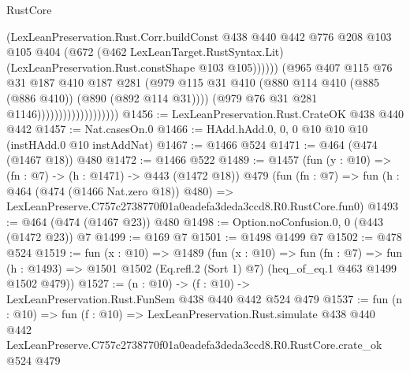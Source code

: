 \begin{lexlean}{RustCore}
\begin{coremodule}
                                            (LexLeanPreservation.Rust.Corr.buildConst
                                              @438
                                              @440
                                              @442
                                              @776
                                              @208
                                              @103
                                              @105
                                              @404
                                              (@672
                                                (@462 LexLeanTarget.RustSyntax.Lit)
                                                (LexLeanPreservation.Rust.constShape @103 @105))))))
                                      (@965
                                        @407
                                        @115
                                        @76
                                        @31
                                        @187
                                        @410
                                        @187
                                        @281
                                        (@979
                                          @115
                                          @31
                                          @410
                                          (@880
                                            @114
                                            @410
                                            (@885 (@886 @410))
                                            (@890 (@892 @114 @31))))
                                        (@979 @76 @31 @281 @1146)))))))))))))))))))
@1456 := LexLeanPreservation.Rust.CrateOK @438 @440 @442
@1457 := Nat.casesOn.{0}
@1466 := HAdd.hAdd.{0, 0, 0} @10 @10 @10 (instHAdd.{0} @10 instAddNat)
@1467 := @1466 @524
@1471 := @464 (@474 (@1467 @18)) @480
@1472 := @1466 @522
@1489 := @1457
    (fun (y : @10) => (fn : @7) -> (h : @1471) -> @443 (@1472 @18))
    @479
    (fun (fn : @7) =>
    fun (h : @464 (@474 (@1466 Nat.zero @18)) @480) =>
    LexLeanPreserve.C757c2738770f01a0eadefa3deda3ccd8.R0.RustCore.fun0)
@1493 := @464 (@474 (@1467 @23)) @480
@1498 := Option.noConfusion.{0, 0} (@443 (@1472 @23)) @7
@1499 := @169 @7
@1501 := @1498 @1499 @7
@1502 := @478 @524
@1519 := fun (x : @10) =>
  @1489
    (fun (x : @10) =>
    fun (fn : @7) =>
    fun (h : @1493) => @1501 @1502 (Eq.refl.{2} (Sort 1) @7) (heq_of_eq.{1} @463 @1499 @1502 @479))
@1527 := (n : @10) -> (f : @10) -> LexLeanPreservation.Rust.FunSem @438 @440 @442 @524 @479
@1537 := fun (n : @10) =>
  fun (f : @10) =>
  LexLeanPreservation.Rust.simulate
    @438
    @440
    @442
    LexLeanPreserve.C757c2738770f01a0eadefa3deda3ccd8.R0.RustCore.crate_ok
    @524
    @479
\end{coremodule}
\end{lexlean}
